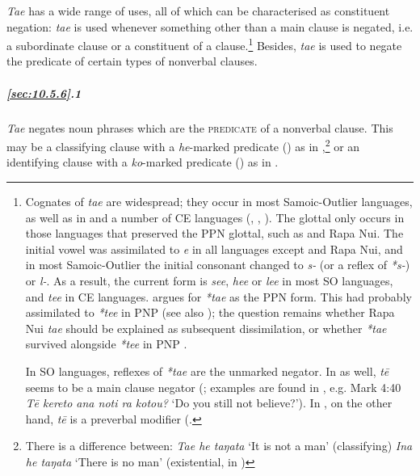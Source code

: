 \textit{Ta{\ꞌ}e} has a wide range of uses, all of which can be characterised as constituent negation: \textit{ta{\ꞌ}e} is used whenever something other than a main clause is negated, i.e. a subordinate clause or a constituent of a clause.\footnote{\label{fn:500}Cognates of \textit{ta{\ꞌ}e} are widespread; they occur in most Samoic-Outlier languages, as well as in  and a number of CE languages (, , ). The glottal only occurs in those languages that preserved the PPN glottal, such as  and Rapa Nui. The initial vowel was assimilated to \textit{e} in all languages except  and Rapa Nui, and in most Samoic-Outlier the initial consonant changed to \textit{s-} (or a reflex of \textit{*s-}) or \textit{l-}. As a result, the current form is \textit{see}, \textit{hee} or \textit{lee} in most SO languages, and \textit{tee} in CE languages. \citet[85–87]{Clark1976} argues for \textit{*ta{\ꞌ}e} as the PPN form. This had probably assimilated to \textit{*te{\ꞌ}e} in PNP (see also \citealt{Hamp1977}); the question remains whether Rapa Nui \textit{ta{\ꞌ}e} should be explained as subsequent dissimilation, or whether \textit{*ta{\ꞌ}e} survived alongside \textit{*te{\ꞌ}e} in PNP \citep[87]{Clark1976}.

In SO languages, reflexes of \textit{*ta{\ꞌ}e} are the unmarked negator. In  as well, \textit{tē} seems to be a main clause negator (\citealt[78]{Janeau1908}; examples are found in \citet{Pupu-takao1908}, e.g. Mark 4:40 \textit{Tē kereto ana noti ra kotou?} ‘Do you still not believe?’). In , on the other hand, \textit{tē} is a preverbal modifier (\citealt[52]{MutuTeìkitutoua2002}.} Besides, \textit{ta{\ꞌ}e} is used to negate the predicate of certain types of nonverbal clauses.

\subparagraph{\ref{sec:10.5.6}.1} \textit{Ta{\ꞌ}e} negates noun phrases which are the \textsc{predicate} of a nonverbal clause. This may be a classifying clause with a \textit{he}{}-marked predicate () as in ,\footnote{\label{fn:501}There is a difference between:
\ea
\textit{Ta{\ꞌ}e he taŋata} \textup{‘It is not a man’ (classifying)}
\z
\ea
\textit{{\ꞌ}Ina he taŋata} \textup{‘There is no man’ (existential,  in )}\z} or an identifying clause with a \textit{ko}{}-marked predicate () as in .

